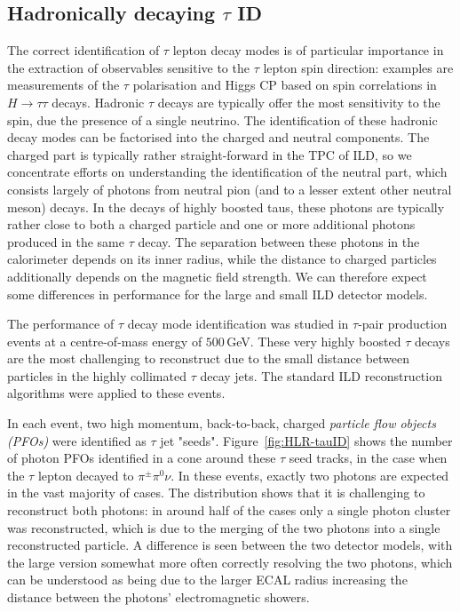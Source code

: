 \subsection[Hadronically decaying tau ID]{Hadronically decaying {\protect$\tau$ ID}}
\label{sec:perf:hlr:tau}

The correct identification of $\tau$ lepton decay modes is of particular importance in the extraction of observables sensitive to the $\tau$ lepton spin direction: examples are measurements of the $\tau$ polarisation and Higgs CP based on spin correlations in $H \to \tau \tau$ decays.
Hadronic $\tau$ decays are typically offer the most sensitivity to the spin, due the presence of a single neutrino. 
The identification of these hadronic decay modes can be factorised into the charged and neutral components. 
The charged part is typically rather straight-forward in the TPC of ILD, so we concentrate efforts on understanding the identification of the neutral part, which consists largely of photons from neutral pion (and to a lesser extent other neutral meson) decays. 
In the decays of highly boosted taus, these photons are typically rather close to both a charged particle and one or more additional photons produced in the same $\tau$ decay. 
The separation between these photons in the calorimeter depends on its inner radius, while the distance to charged particles additionally depends on the magnetic field strength. 
We can therefore expect some differences in performance for the large and small ILD detector models.

The performance of $\tau$ decay mode identification was studied in $\tau$-pair production events at a centre-of-mass energy of $500$\,GeV. 
These very highly boosted $\tau$ decays are the most challenging to reconstruct due to the small distance between particles in the highly collimated $\tau$ decay jets.
The standard ILD reconstruction algorithms were applied to these events.

In each event, two high momentum, back-to-back, charged \emph{particle flow objects  (PFOs)} were identified as $\tau$ jet "seeds". Figure~\ref{fig:HLR-tauID} shows the number of photon PFOs identified in a cone around these $\tau$ seed tracks, in the case when the $\tau$ lepton decayed to $\pi^\pm \pi^0 \nu$.
In these events, exactly two photons are expected in the vast majority of cases. 
The distribution shows that it is challenging to reconstruct both photons: in around half of the cases only a single photon cluster was reconstructed, which is due to the merging of the two photons into a single reconstructed particle. 
A difference is seen between the two detector models, with the large version somewhat more often correctly resolving the two photons, which can be understood as being due to the larger ECAL radius increasing the distance between the photons' electromagnetic showers.



